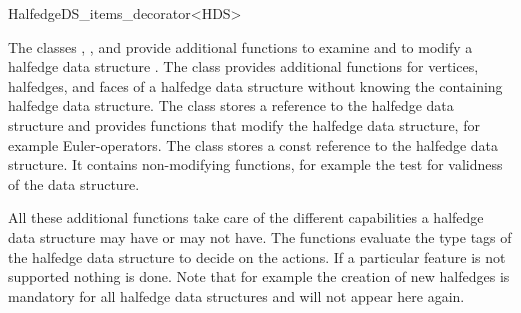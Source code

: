 
\ccRefPageBegin



\begin{ccRefClass}{HalfedgeDS_items_decorator<HDS>}

\ccDefinition

The classes ,
, and
 provide additional functions
to examine and to modify a halfedge data structure . The class
 provides additional functions
for vertices, halfedges, and faces of a halfedge data structure
without knowing the containing halfedge data structure. The class
 stores a reference to the halfedge
data structure and provides functions that modify the halfedge data
structure, for example Euler-operators. The class
 stores a const reference to
the halfedge data structure. It contains non-modifying functions, for
example the test for validness of the data structure.

All these additional functions take care of the different capabilities
a halfedge data structure may have or may not have.  The functions
evaluate the type tags of the halfedge data structure to decide on the
actions. If a particular feature is not supported nothing is done.
Note that for example the creation of new halfedges is mandatory for
all halfedge data structures and will not appear here again.


\ccTypes

\ccThreeToTwo

\ccGlue
{}
\ccGlue
{}
\ccGlue
{}
\ccGlue
{}


\end{ccRefClass}

